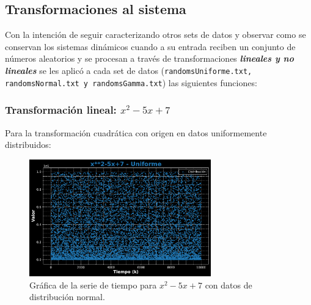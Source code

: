 \documentclass[11pt]{article} %
\begin{document}
	
	\subsection{Transformaciones al sistema}
	
	Con la intención de seguir caracterizando otros sets de datos y observar como se conservan los sistemas dinámicos cuando a su entrada reciben un conjunto de números aleatorios y se procesan a través de transformaciones \textbf{\textit{lineales y no lineales}} se les aplicó a cada set de datos (\texttt{randomsUniforme.txt, randomsNormal.txt y randomsGamma.txt}) las siguientes funciones:
	
	\newpage
	
	\subsubsection{Transformación lineal: $x^2 - 5x + 7$}
	
	Para la transformación cuadrática con origen en datos uniformemente distribuidos:
	\begin{figure}[h]
		\centering
		\includegraphics[width=0.7\textwidth]{../transformaciones/cuad_uniforme1.pdf}
		\caption{Gráfica de la serie de tiempo para $x^2 - 5x + 7$ con datos de distribución normal.}
		\label{fig:cuadUnifGraf}
	\end{figure}
	
\end{document}
